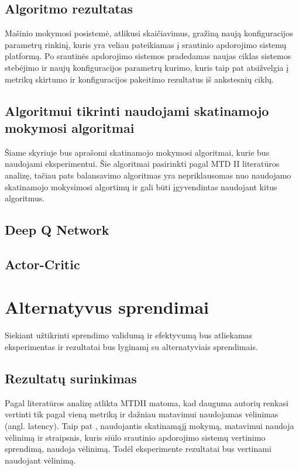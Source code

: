 \documentclass{VUMIFPSbakalaurinis}
\begin{document}
\subsection{Algoritmo rezultatas}
Mašinio mokymosi posistemė, atlikusi skaičiavimus, gražiną naują konfiguracijos parametrų rinkinį, kuris yra veliau pateikiamas į srautinio apdorojimo sistemų platformą. Po srautinės apdorojimo sistemos pradedamas naujas ciklas sistemos stebėjimo ir naujų konfiguracijos parametrų kurimo, kuris taip pat atsižvelgia į metrikų skirtumo ir konfiguracijos pakeitimo rezultatus iš  ankstesnių ciklų.

\subsection{Algoritmui tikrinti naudojami skatinamojo mokymosi algoritmai}
Šiame skyriuje bus aprašomi skatinamojo mokymosi algoritmai, kurie bus naudojami eksperimentui. Šie algoritmai pasirinkti pagal MTD II literatūros analizę, tačiau pats balansavimo algoritmas yra nepriklausomas nuo naudojamo skatinamojo mokysimosi algortimų ir gali būti įgyvendintas naudojant kitus algoritmus.
\subsection{Deep Q Network}

\subsection{Actor-Critic}

\section{Alternatyvus sprendimai}
Siekiant užtikrinti sprendimo validumą ir efektyvumą bus atliekamas eksperimentas ir rezultatai bus lyginamį su alternatyviais sprendimais.

\subsection{Rezultatų surinkimas}

Pagal literatūros analizę atlikta MTDII matoma, kad dauguma autorių renkasi vertinti tik pagal vieną metriką ir dažniau matavimui naudojamas vėlinimas (angl. latency). Taip pat \cite{vaquero2018autotuning}, naudojantis skatinamąjį mokymą, matavimui naudoja vėlinimą ir \cite{Chintapalli2016Benchmarking} straipsnis, kuris siūlo srautinio apdorojimo sistemų vertinimo sprendimą, naudoja vėlinimą. Todėl eksperimente rezultatai bus vertinami naudojant vėlinimą.   
\end{document}
